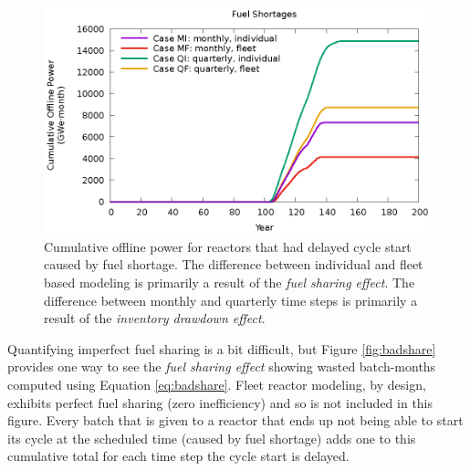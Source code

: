 \documentclass{style}
\begin{document}
\begin{figure}[!h]
    \centering
    \includegraphics[width=1.0\columnwidth]{exp2/unfueled.eps}
    \caption[Cumulative offline power caused by fuel shortage]{
        Cumulative offline power for reactors that had delayed cycle start caused
        by fuel shortage. The difference between individual and fleet based
        modeling is primarily a result of the \emph{fuel sharing effect}. The
        difference between monthly and quarterly time steps is primarily
        a result of the \emph{inventory drawdown effect}.
    }
    \label{fig:unfueled}
\end{figure}

Quantifying imperfect fuel sharing is a bit difficult, but Figure
\ref{fig:badshare} provides one way to see the \emph{fuel sharing effect}
showing wasted batch-months computed using Equation \ref{eq:badshare}.  Fleet
reactor modeling, by design, exhibits perfect fuel sharing (zero
inefficiency) and so is not included in this figure.  Every batch that is
given to a reactor that ends up not being able to start its cycle at the
scheduled time (caused by fuel shortage) adds one to this cumulative total for each
time step the cycle start is delayed.

\end{document}
